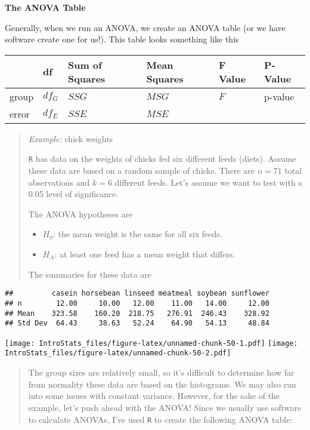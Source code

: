 \documentclass[
]{book}
\providecommand{\tightlist}{%
  \setlength{\itemsep}{0pt}\setlength{\parskip}{0pt}}
\begin{document}
\textbf{The ANOVA Table}

Generally, when we run an ANOVA, we create an ANOVA table (or we have software create one for us!). This table looks something like this

\begin{longtable}[]{@{}llllll@{}}
\toprule
& df & Sum of Squares & Mean Squares & F Value & P-Value \\
\midrule
\endhead
group & \(df_G\) & \(SSG\) & \(MSG\) & \(F\) & p-value \\
error & \(df_E\) & \(SSE\) & \(MSE\) & & \\
\bottomrule
\end{longtable}

\begin{quote}
\emph{Example:} chick weights

\texttt{R} has data on the weights of chicks fed six different feeds (diets). Assume these data are based on a random sample of chicks. There are \(n=71\) total observations and \(k=6\) different feeds. Let's assume we want to test with a 0.05 level of significance.

The ANOVA hypotheses are

\begin{itemize}
\tightlist
\item
  \(H_0\): the mean weight is the same for all six feeds.
\item
  \(H_A\): at least one feed has a mean weight that differs.
\end{itemize}

The summaries for these data are
\end{quote}

\begin{verbatim}
##         casein horsebean linseed meatmeal soybean sunflower
## n        12.00     10.00   12.00    11.00   14.00     12.00
## Mean    323.58    160.20  218.75   276.91  246.43    328.92
## Std Dev  64.43     38.63   52.24    64.90   54.13     48.84
\end{verbatim}

\texttt{[image: IntroStats\_files/figure-latex/unnamed-chunk-50-1.pdf]} \texttt{[image: IntroStats\_files/figure-latex/unnamed-chunk-50-2.pdf]}

\begin{quote}
The group sizes are relatively small, so it's difficult to determine how far from normality these data are based on the histograms. We may also run into some issues with constant variance. However, for the sake of the example, let's push ahead with the ANOVA! Since we usually use software to calculate ANOVAs, I've used \texttt{R} to create the following ANOVA table:
\end{quote}
\end{document}
